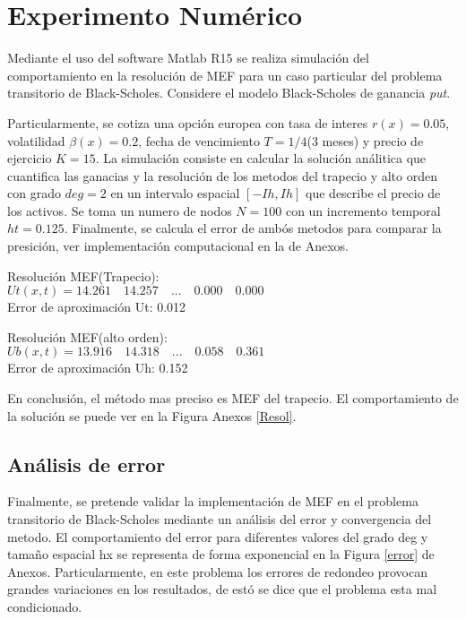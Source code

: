 \documentclass[12pt]{article}
\begin{document}
\section{Experimento Numérico}
Mediante el uso del software Matlab R15 se realiza simulación del comportamiento en la resolución de MEF para un caso particular del problema transitorio de Black-Scholes. Considere el modelo Black-Scholes de ganancia \textit{put}.

Particularmente, se cotiza una opción europea con tasa de interes $r(x)=0.05$, volatilidad $\beta(x)=0.2$, fecha de vencimiento $T=1/4$(3 meses) y precio de ejercicio $K=15$. La simulación consiste en calcular la solución análitica que cuantifica las ganacias y la resolución de los metodos del trapecio y alto orden con grado $deg=2$ en un intervalo espacial $[-Ih,Ih]$ que describe el precio de los activos. Se toma un numero de nodos $N=100$ con un incremento temporal $ht=0.125$. Finalmente, se calcula el error de ambós metodos para comparar la presición, ver implementación computacional en la  de Anexos. 

Resolución MEF(Trapecio):\\ 
$Ut(x, t)=  14.261 \quad  14.257  \quad ... \quad 0.000 \quad 0.000$\\
Error de aproximación Ut: 0.012

Resolución MEF(alto orden):\\
$Ub(x,t)= 13.916 \quad  14.318  \quad ... \quad 0.058  \quad  0.361$\\
Error de aproximación Uh: 0.152

En conclusión, el método mas preciso es MEF del trapecio. El comportamiento de la solución se puede ver en la Figura Anexos \ref{Resol}.
\subsection{Análisis de error}
Finalmente, se pretende validar la implementación de MEF en el problema transitorio de Black-Scholes mediante un análisis del error y convergencia del metodo. El comportamiento del error para diferentes valores del grado deg y tamaño espacial hx se representa de forma exponencial en la Figura \ref{error} de Anexos. Particularmente, en este problema los errores de redondeo provocan grandes variaciones en los resultados, de estó se dice que el problema esta mal condicionado.
\end{document}

